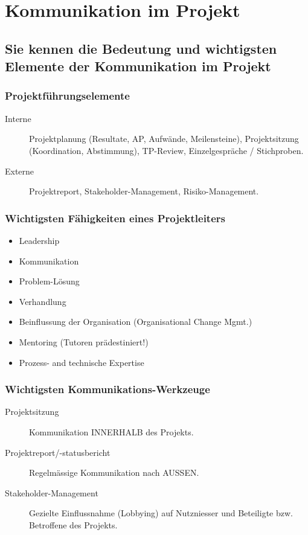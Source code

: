 \chapter{Kommunikation im Projekt}

\section{Sie kennen die Bedeutung und wichtigsten Elemente der Kommunikation im Projekt}

\subsection{Projektführungselemente}
\begin{description}
	\item[Interne]  Projektplanung (Resultate, AP, Aufwände, Meilensteine), Projektsitzung (Koordination, Abstimmung), TP-Review, Einzelgespräche / Stichproben.
	\item[Externe] Projektreport, Stakeholder-Management, Risiko-Management.
\end{description}

\subsection{Wichtigsten Fähigkeiten eines Projektleiters}
\begin{itemize}
	\item Leadership
	\item Kommunikation
	\item Problem-Lösung
	\item Verhandlung
	\item Beinflussung der Organisation (Organisational Change Mgmt.)
	\item Mentoring (Tutoren prädestiniert!)
	\item Prozess- and technische Expertise
\end{itemize}

\subsection{Wichtigsten Kommunikations-Werkzeuge}
\begin{description}
	\item[Projektsitzung] Kommunikation INNERHALB des Projekts.
	\item[Projektreport/-statusbericht] Regelmässige Kommunikation nach AUSSEN.
	\item[Stakeholder-Management] Gezielte Einflussnahme (Lobbying) auf Nutzniesser und Beteiligte bzw. Betroffene des Projekts.
\end{description}


